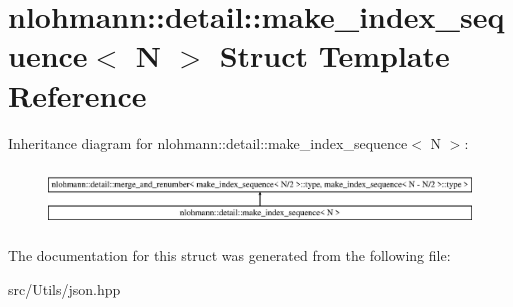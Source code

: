 \hypertarget{structnlohmann_1_1detail_1_1make__index__sequence}{}\section{nlohmann\+:\+:detail\+:\+:make\+\_\+index\+\_\+sequence$<$ N $>$ Struct Template Reference}
\label{structnlohmann_1_1detail_1_1make__index__sequence}
Inheritance diagram for nlohmann\+:\+:detail\+:\+:make\+\_\+index\+\_\+sequence$<$ N $>$\+:\begin{figure}[H]
\begin{center}
\leavevmode
\includegraphics[height=1.597718cm]{d9/d0e/structnlohmann_1_1detail_1_1make__index__sequence}
\end{center}
\end{figure}


The documentation for this struct was generated from the following file\+:\begin{DoxyCompactItemize}
\item 
src/\+Utils/json.\+hpp\end{DoxyCompactItemize}
